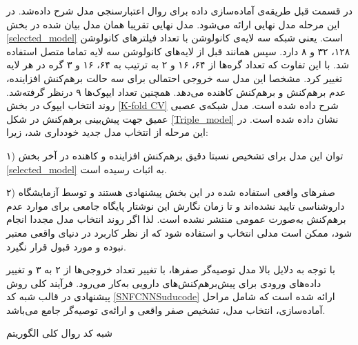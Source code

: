 در قسمت قبل طریقه‌ی آماده‌سازی داده برای روال اعتبارسنجی مدل شرح داده‌شد. در این مرحله مدل نهایی ارائه می‌شود. مدل نهایی تقریبا همان مدل بیان شده در بخش 
\ref{selected_model}
است. یعنی شبکه سه لایه‌ی کانولوشن با تعداد فیلترهای کانولوشن ۱۲۸، ۳۲ و ۸ دارد. سپس همانند قبل از لایه‌های کانولوشن سه لایه تماما متصل استفاده شد. با این تفاوت که تعداد گره‌ها از ۶۴، ۱۶ و ۲  به ترتیب به ۶۴، ۱۶ و ۳ گره در هر لایه تغییر کرد. مشخصا این مدل سه خروجی احتمالی برای سه حالت برهم‌کنش افزاینده، عدم برهم‌کنش و برهم‌کنش کاهنده می‌دهد. همچنین تعداد ایپوک‌ها ۹ درنظر گرفته‌شد. روند انتخاب ایپوک در بخش
\ref{K-fold CV}
شرح داده ‌شده ‌است. مدل شبکه‌ی عصبی عمیق جهت پیش‌بینی برهم‌کنش در شکل
\ref{Triple_model}
نشان داده ‌شده ‌است. در این مرحله از انتخاب مدل جدید خودداری شد، زیرا:

۱) توان این مدل برای تشخیص نسبتا دقیق برهم‌کنش افزاینده و کاهنده در آخر بخش
\ref{selected_model}
به اثبات رسیده ‌است.

۲) صفرهای واقعی استفاده شده در این بخش پیشنهادی هستند و توسط آزمایشگاه داروشناسی تایید نشده‌اند و تا زمان نگارش این نوشتار پایگاه جامعی برای موارد عدم برهم‌کنش به‌صورت عمومی منتشر نشده ‌است. لذا اگر روند انتخاب مدل مجددا انجام شود، ممکن است مدلی انتخاب و استفاده شود که از نظر کاربرد در دنیای واقعی معتبر نبوده و مورد قبول قرار نگیرد.

با توجه به دلایل بالا مدل توصیه‌گر صفرها، با تغییر تعداد خروجی‌ها از ۲ به ۳ و تغییر داده‌های ورودی برای پیش‌برهم‌کنش‌های دارویی به‌کار می‌رود. فرآیند کلی روش پیشنهادی
در قالب شبه کد 
\ref{SNFCNNSuducode}
ارائه شده است که شامل مراحل آماده‌سازی، انتخاب مدل، تشخیص صفر واقعی و ارائه‌ی توصیه‌گر جامع می‌باشد.

\renewcommand{\algorithmicrequire}{\textbf{ورودی:}}
\renewcommand{\algorithmicensure}{\textbf{خروجی:}}
\begin{algorithm}
\caption{
شبه کد روال کلی الگوریتم 
}
\label{SNFCNNSuducode}
\end{algorithm}


